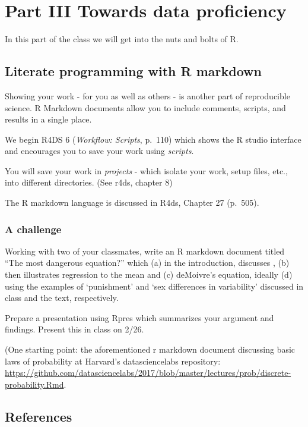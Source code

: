 \documentclass[]{book}
\theoremstyle{definition}
\theoremstyle{definition}
\theoremstyle{definition}
\theoremstyle{remark}
\begin{document}
\part{Part III Towards data
proficiency}\label{part-part-iii-towards-data-proficiency}

In this part of the class we will get into the nuts and bolts of R.

\chapter{Literate programming with R
markdown}\label{literate-programming-with-r-markdown}

Showing your work - for you as well as others - is another part of
reproducible science. R Markdown documents allow you to include
comments, scripts, and results in a single place.

We begin R4DS 6 (\emph{Workflow: Scripts}, p.~110) which shows the R
studio interface and encourages you to save your work using
\emph{scripts}.

You will save your work in \emph{projects} - which isolate your work,
setup files, etc., into different directories. (See r4ds, chapter 8)

The R markdown language is discussed in R4ds, Chapter 27 (p.~505).

\section{A challenge}\label{a-challenge-1}

Working with two of your classmates, write an R markdown document titled
``The most dangerous equation?'' which (a) in the introduction,
discusses \citet{wainer2007most}, (b) then illustrates regression to the
mean and (c) deMoivre's equation, ideally (d) using the examples of
`punishment' and `sex differences in variability' discussed in class and
the text, respectively.

Prepare a presentation using Rpres which summarizes your argument and
findings. Present this in class on 2/26.

(One starting point: the aforementioned r markdown document discussing
basic laws of probability at Harvard's datasciencelabs repository:
\url{https://github.com/datasciencelabs/2017/blob/master/lectures/prob/discrete-probability.Rmd}.

\chapter{References}\label{references}


\end{document}
